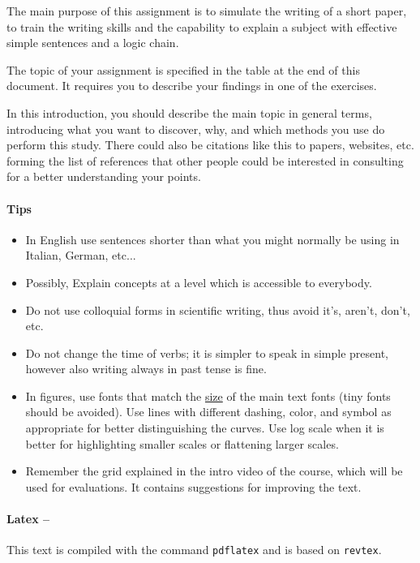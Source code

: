 The main purpose of this assignment is to simulate the writing of a short paper, to train the writing skills and the capability to explain a subject with effective simple sentences and a logic chain.

The topic of your assignment is specified in the table at the end of this document.
It requires you to describe your findings in one of the exercises.

In this introduction,
you should describe the main topic in general terms, introducing what you want to discover, why, and which
methods you use do perform this study.
There could also be citations like this \cite{pap1} to papers, websites, etc. forming the list of references that other people could be interested in consulting for a better understanding your points.

\paragraph{\bf Tips}
\begin{itemize}
\item In English use sentences shorter than what you might normally be using in Italian, German, etc...
\item Possibly, Explain concepts at a level which is accessible to everybody.
\item Do not use colloquial forms in scientific writing, thus avoid it's, aren't, don't, etc.
\item Do not change the time of verbs; it is simpler to speak in simple present, however also writing always in past tense is fine.
\item In figures, use fonts that match the \underline{size} of the main text fonts (tiny fonts should be avoided). Use lines with different dashing, color, and symbol as appropriate for better distinguishing the curves. Use log scale when it is better for highlighting smaller scales or flattening larger scales. 
\item Remember the grid explained in the intro video of the course, which will be used for evaluations. It contains suggestions for improving the text.
\end{itemize}




\paragraph{\bf Latex --}

This text is compiled with the command \texttt{pdflatex} and is based on \texttt{revtex}.

